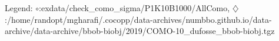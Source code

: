 Legend: {\color{NavyBlue}$\circ$}:exdata/check\_como\_sigma/P1K10B1000/AllComo, {\color{Magenta}$\diamondsuit$}:/home/randopt/mgharafi/.cocopp/data-archives/numbbo.github.io/data-archive/data-archive/bbob-biobj/2019/COMO-10\_dufosse\_bbob-biobj.tgz